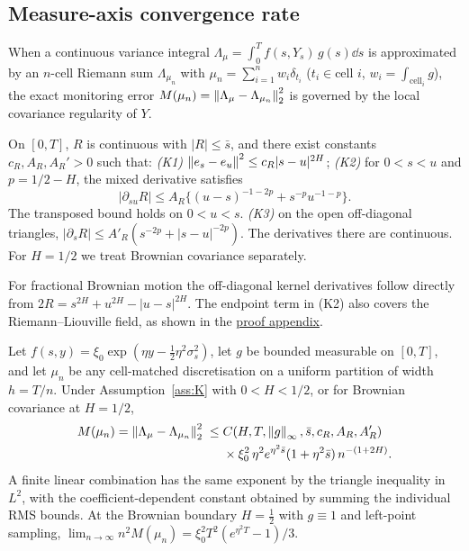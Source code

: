 \subsection{Measure-axis convergence rate}\label{sec:rate}
When a continuous variance integral $\Lambda_\mu=\int_0^T f(s,Y_s)\,g(s)\dd s$ is approximated by an
$n$-cell Riemann sum $\Lambda_{\mu_n}$ with $\mu_n=\sum_{i=1}^n w_i\delta_{t_i}$ ($t_i\in\text{cell }i$,
$w_i=\int_{\text{cell}_i}g$), the exact monitoring error $M(\mu_n)=\left\lVert \Lambda_\mu-\Lambda_{\mu_n}\right\rVert_2^2$
is governed by the local covariance regularity of $Y$.

\begin{assumption}\label{ass:K}
On $[0,T]$, $R$ is continuous with $|R|\le\bar s$, and there exist constants $c_R,A_R,A_R'>0$ such that:
\emph{(K1)} $\left\lVert e_s-e_u\right\rVert^2\le c_R|s-u|^{2H}$;
\emph{(K2)} for $0<s<u$ and $p=1/2-H$, the mixed derivative satisfies
\[
 |\partial_{su}R|\le A_R\{(u-s)^{-1-2p}+s^{-p}u^{-1-p}\}.
\]
The transposed bound holds on $0<u<s$. \emph{(K3)} on the open off-diagonal triangles,
$|\partial_sR|\le A'_R(s^{-2p}+|s-u|^{-2p})$.
The derivatives there are continuous. For $H=1/2$ we treat Brownian covariance separately.
\end{assumption}

For fractional Brownian motion the off-diagonal kernel derivatives follow directly from
$2R=s^{2H}+u^{2H}-|u-s|^{2H}$. The endpoint term in (K2) also covers the
Riemann--Liouville field, as shown in the \hyperref[app:proofs]{proof appendix}.

\begin{theorem}\label{thm:rate}
Let $f(s,y)=\xi_0\exp(\eta y-\tfrac12\eta^2\sigma_s^2)$, let
$g$ be bounded measurable on $[0,T]$, and let $\mu_n$ be any cell-matched discretisation on a uniform
partition of width $h=T/n$. Under Assumption~\ref{ass:K} with $0<H<1/2$, or for Brownian covariance at $H=1/2$,
\begin{equation}\label{eq:rate}
\begin{split}
  M(\mu_n)=\left\lVert \Lambda_\mu-\Lambda_{\mu_n}\right\rVert_2^2
  \;\le\;&C(H,T,\left\lVert g\right\rVert_\infty,\bar s,c_R,A_R,A_R')\\
  &\times\xi_0^2\,\eta^2 e^{\eta^2\bar s}(1+\eta^2\bar s)\,n^{-(1+2H)}.
\end{split}
\end{equation}
A finite linear combination has the same exponent by the triangle inequality in $L^2$, with the coefficient-dependent constant obtained by summing the individual RMS bounds. At the Brownian boundary $H=\tfrac12$ with $g\equiv1$ and left-point sampling,
$\lim_{n\to\infty} n^2 M(\mu_n)=\xi_0^2 T^2(e^{\eta^2 T}-1)/3$.
\end{theorem}

